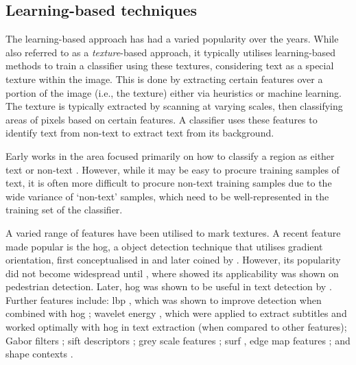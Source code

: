\clearpage

\subsection{Learning-based techniques}
\label{sec:detection:learning}

The learning-based approach has had a varied popularity over the years. While also referred to as a \textit{texture}-based approach, it typically utilises learning-based methods to train a classifier using these textures, considering text as a special texture within the image. This is done by extracting certain features over a portion of the image (i.e., the texture) either via heuristics or machine learning. The texture is typically extracted by scanning at varying scales, then classifying areas of pixels based on certain features. A classifier uses these features to identify text from non-text to extract text from its background.

Early works in the area focused primarily on how to classify a region as either text or non-text \citep{Sobottka:1999wi, Lienhart:2002ub, Li:2000uf, Kim:2003wj}. However, while it may be easy to procure training samples of text, it is often more difficult to procure non-text training samples \cite{Sung:1998vt,Heisele:2001ue} due to the wide variance of `non-text' samples, which need to be well-represented in the training set of the classifier.

A varied range of features have been utilised to mark textures. A recent feature made popular is the \gls{hog}, a object detection technique that utilises gradient orientation, first conceptualised in \citep{McConnell:1986wsb} and later coined by \citet{Freeman:1995uh}. However, its popularity did not become widespread until \citep{Dalal:2005jq}, where \citeauthor{Dalal:2005jq} showed its applicability was shown on pedestrian detection. Later, \gls{hog} was shown to be useful in text detection by \citet{Hanif:2008un}. Further features include: \gls{lbp} \citep{Ojala:1994hz}, which was shown to improve detection when combined with \gls{hog} \cite{Wang:2009wi}; wavelet energy \citep{Mohan:2001vb, Viola:2003ud}, which were applied to extract subtitles \citep{Gllavata:2004vq} and worked optimally with \gls{hog} in text extraction \citep{Pan:2010cj} (when compared to other features); Gabor filters \citep{Liu:2005et}; \gls{sift} descriptors \citep{Lowe:2004kp}; grey scale features \citep{Kim:2003wj}; \gls{surf} \cite{Bay:2008ud}, edge map features \cite{Chen:2004tj}; and shape contexts \citep{Belongie:2001uj}.


